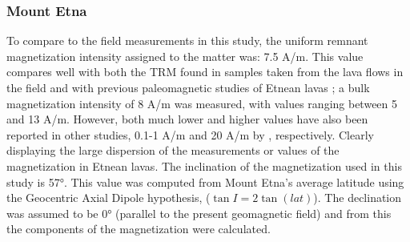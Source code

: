 \subsubsection{Mount Etna}
To compare to the field measurements in this study, the uniform remnant magnetization intensity assigned to the matter was: 7.5 A/m. This value compares well with both the TRM found in samples taken from the lava flows in the field \parencite{Meyer23} and with previous paleomagnetic studies of Etnean lavas \parencite{Nicolosi14}; a bulk magnetization intensity of 8 A/m was measured, with values ranging between 5 and 13 A/m. However, both much lower and higher values have also been reported in other studies, 0.1-1 A/m and 20 A/m by \parencite{Tanguy04, Speranza06}, respectively. Clearly displaying the large dispersion of the measurements or values of the magnetization in Etnean lavas. The inclination of the magnetization used in this study is \ang{57}. This value was computed from Mount Etna's average latitude using the Geocentric Axial Dipole hypothesis, ($\tan{I} = 2\tan({lat})$). The declination was assumed to be \ang{0} (parallel to the present geomagnetic field) and from this the components of the magnetization were calculated. 

